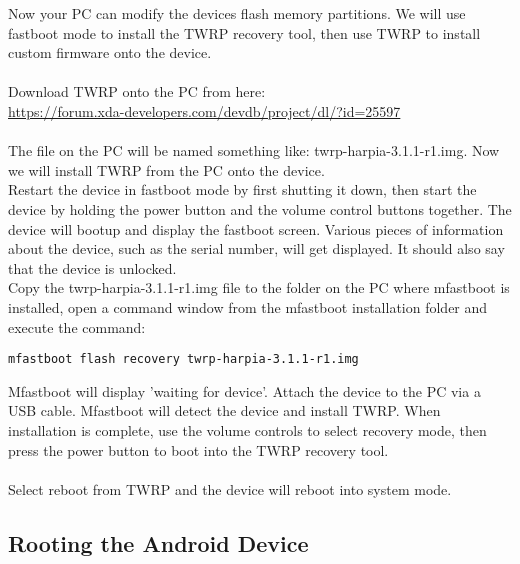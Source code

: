 \noindent Now your PC can modify the devices flash memory partitions.  We will use fastboot mode to install the TWRP recovery tool, then use TWRP to install custom firmware onto the device.\\
\\
Download TWRP onto the PC from here:\\
\url{https://forum.xda-developers.com/devdb/project/dl/?id=25597}\\
\\
The file on the PC will be named something like: twrp-harpia-3.1.1-r1.img.  Now we will install TWRP from the PC onto the device.\\

\noindent Restart the device in fastboot mode by first shutting it down, then start the device by holding the power button and the volume control buttons together.  The device will bootup and display the fastboot screen.  Various pieces of information about the device, such as the serial number, will get displayed.  It should also say that the device is unlocked.\\

\noindent Copy the twrp-harpia-3.1.1-r1.img file to the folder on the PC where mfastboot is installed, open a command window from the mfastboot installation folder and execute the command:
\begin{verbatim}mfastboot flash recovery twrp-harpia-3.1.1-r1.img\end{verbatim}

\noindent Mfastboot will display 'waiting for device'.  Attach the device to the PC via a USB cable.  Mfastboot will detect the device and install TWRP.  When installation is complete, use the volume controls to select recovery mode, then press the power button to boot into the TWRP recovery tool.\\
\\
Select reboot from TWRP and the device will reboot into system mode.
	
\subsection{Rooting the Android Device}
\label{sec:Rooting the Android device}

